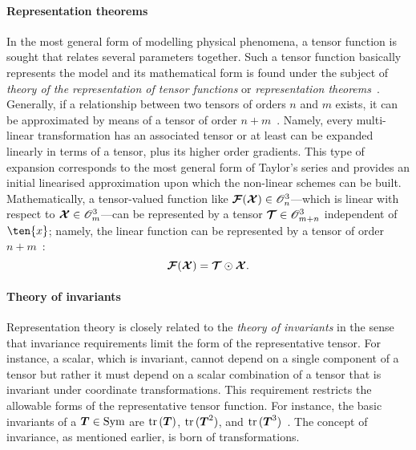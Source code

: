 	\paragraph{Representation theorems} In the most general form of modelling physical phenomena, a tensor function is sought that relates several parameters together. Such a tensor function basically represents the model and its mathematical form is found under the subject of \textit{theory of the representation of tensor functions} or \textit{representation theorems}~\autocite{Schade.2018,Brannon.2003}. Generally, if a relationship between two tensors of orders $n$ and $m$ exists, it can be approximated by means of a tensor of order $n+m$~\autocite{Brannon.2017}. Namely, every multi-linear transformation has an associated tensor or at least can be expanded linearly in terms of a tensor, plus its higher order gradients. This type of expansion corresponds to the most general form of Taylor's series and provides an initial linearised approximation upon which the non-linear schemes can be built. Mathematically, a tensor-valued function like $\mathord{\mbox{\boldmath$\mathcal{F}$}}(\mathord{\mbox{\boldmath$\mathcal{X}$}})\in\mathscr{O}_{n}^{3}$---which is linear with respect to $\mathord{\mbox{\boldmath$\mathcal{X}$}}\in\mathscr{O}_{m}^{3}$---can be represented by a tensor $\mathord{\mbox{\boldmath$\mathcal{T}$}}\in\mathscr{O}_{m+n}^{3}$ independent of $\ten{x}$; namely, the linear function can be represented by a tensor of order $n+m$~\autocite{Hartmann.1984}:
	\begin{equation}
	\mathord{\mbox{\boldmath$\mathcal{F}$}}(\mathord{\mbox{\boldmath$\mathcal{X}$}})=\mathord{\mbox{\boldmath$\mathcal{T}$}}\odot\mathord{\mbox{\boldmath$\mathcal{X}$}}.
	\end{equation}
	
	\paragraph{Theory of invariants} Representation theory is closely related to the \textit{theory of invariants} in the sense that invariance requirements limit the form of the representative tensor. For instance, a scalar, which is invariant, cannot depend on a single component of a tensor but rather it must depend on a scalar combination of a tensor that is invariant under coordinate transformations. This requirement restricts the allowable forms of the representative tensor function. For instance, the basic invariants of a $\tenb{T}\in\symset$ are $\tr{(\tenb{T})}$, $\tr{(\tenb{T}^2)}$, and $\tr{(\tenb{T}^3)}$~\autocite{Wang.1970}. The concept of invariance, as mentioned earlier, is born of transformations.

